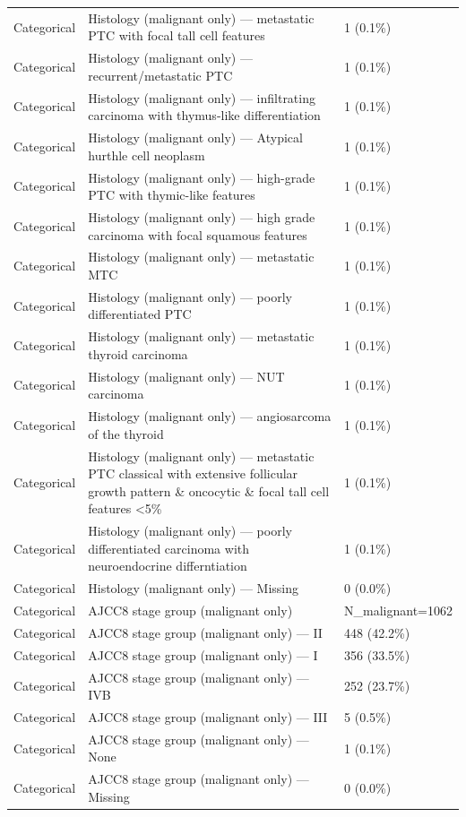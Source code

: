 \begin{table}[htbp]
\begin{tabular}{lll}
Categorical & Histology (malignant only) — metastatic PTC with focal tall cell features & 1 (0.1\%) \\
Categorical & Histology (malignant only) — recurrent/metastatic PTC & 1 (0.1\%) \\
Categorical & Histology (malignant only) — infiltrating carcinoma with thymus-like differentiation & 1 (0.1\%) \\
Categorical & Histology (malignant only) — Atypical hurthle cell neoplasm & 1 (0.1\%) \\
Categorical & Histology (malignant only) — high-grade PTC with thymic-like features & 1 (0.1\%) \\
Categorical & Histology (malignant only) — high grade carcinoma with focal squamous features & 1 (0.1\%) \\
Categorical & Histology (malignant only) — metastatic MTC & 1 (0.1\%) \\
Categorical & Histology (malignant only) — poorly differentiated PTC & 1 (0.1\%) \\
Categorical & Histology (malignant only) — metastatic thyroid carcinoma & 1 (0.1\%) \\
Categorical & Histology (malignant only) — NUT carcinoma & 1 (0.1\%) \\
Categorical & Histology (malignant only) — angiosarcoma of the thyroid & 1 (0.1\%) \\
Categorical & Histology (malignant only) — metastatic PTC classical with extensive follicular growth pattern \& oncocytic \& focal tall cell features <5\% & 1 (0.1\%) \\
Categorical & Histology (malignant only) — poorly differentiated carcinoma with neuroendocrine differntiation & 1 (0.1\%) \\
Categorical & Histology (malignant only) — Missing & 0 (0.0\%) \\
Categorical & AJCC8 stage group (malignant only) & N\_malignant=1062 \\
Categorical & AJCC8 stage group (malignant only) — II & 448 (42.2\%) \\
Categorical & AJCC8 stage group (malignant only) — I & 356 (33.5\%) \\
Categorical & AJCC8 stage group (malignant only) — IVB & 252 (23.7\%) \\
Categorical & AJCC8 stage group (malignant only) — III & 5 (0.5\%) \\
Categorical & AJCC8 stage group (malignant only) — None & 1 (0.1\%) \\
Categorical & AJCC8 stage group (malignant only) — Missing & 0 (0.0\%) \\

\end{tabular}
\end{table}
